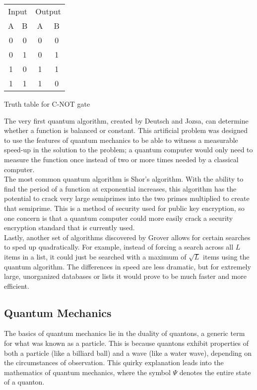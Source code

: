 \documentclass[11pt]{article}
\begin{document}
\begin{multicols}{2}
\begin{ctable}
  \begin{center}
  \begin{tabular}{c c || c c}
  \multicolumn{2}{c|}{Input} & \multicolumn{2}{c}{Output} \\
    A & B & A & B \\
    \hline
    0 & 0 & 0 & 0 \\
    0 & 1 & 0 & 1 \\
    1 & 0 & 1 & 1 \\
    1 & 1 & 1 & 0 \\
  \end{tabular}
  \end{center}
  \caption{Truth table for C-NOT gate}
  \label{tab:cnot}
\end{ctable}
\vspace{1em}

The very first quantum algorithm, created by Deutsch and Jozsa, can determine whether a function is balanced or constant.\cite{lnmr,mit-lab} This artificial problem was designed to use the features of quantum mechanics to be able to witness a measurable speed-up in the solution to the problem; a quantum computer would only need to measure the function once instead of two or more times needed by a classical computer. \\

The most common quantum algorithm is Shor's algorithm. With the ability to find the period of a function at exponential increases, this algorithm has the potential to crack very large semiprimes into the two primes multiplied to create that semiprime.\cite{lnmr} This is a method of security used for public key encryption, so one concern is that a quantum computer could more easily crack a security encryption standard that is currently used. \\

Lastly, another set of algorithms discovered by Grover allows for certain searches to sped up quadratically.\cite{lnmr,mit-lab} For example, instead of forcing a search across all $L$ items in a list, it could just be searched with a maximum of $\sqrt{L}$ items using the quantum algorithm. The differences in speed are less dramatic, but for extremely large, unorganized databases or lists it would prove to be much faster and more efficient.

  \subsection{Quantum Mechanics}
  The basics of quantum mechanics lie in the duality of quantons, a generic term for what was known as a particle. This is because quantons exhibit properties of both a particle (like a billiard ball) and a wave (like a water wave), depending on the circumstances of observation. This quirky explanation leads into the mathematics of quantum mechanics, where the symbol $\Psi$ denotes the entire state of a quanton. \\


\end{multicols}
\end{document}
